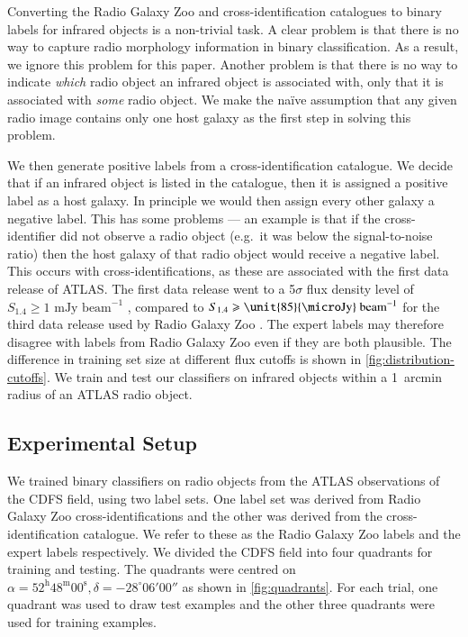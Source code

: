 \documentclass[fleqn,usenatbib,usedcolumn]{mnras}
\newcommand{\jansky}{\text{Jy}}
\begin{document}
    Converting the Radio Galaxy Zoo and \citet{norris06} cross-identification
    catalogues to binary labels for infrared objects is a non-trivial task. A
    clear problem is that there is no way to capture radio morphology
    information in binary classification. As a result, we ignore this problem
    for this paper. Another problem is that there is no way to indicate
    \emph{which} radio object an infrared object is associated with, only that
    it is associated with \emph{some} radio object. We make the na\"ive
    assumption that any given radio image contains only one host galaxy as the
    first step in solving this problem.

    We then generate positive labels from a cross-identification catalogue.
    We decide that if an infrared object is listed in the catalogue, then it
    is assigned a positive label as a host galaxy. In principle we would
    then assign every other galaxy a negative label. This has some problems
    --- an example is that if the cross-identifier did not observe a radio
    object (e.g.~it was below the signal-to-noise ratio) then the host galaxy
    of that radio object would receive a negative label. This occurs with
    \citet{norris06} cross-identifications, as these are associated with the
    first data release of ATLAS. The first data release went to a 5$\sigma$
    flux density level of $S_{1.4} \geq 1 \text{ mJy beam}^{-1}$
    \citep{norris06}, compared to $S_{1.4} \geq \unit{85}{\micro\jansky}\text{
    beam}^{-1}$ for the third data release used by Radio Galaxy Zoo
    \citep{franzen15}. The expert labels may therefore disagree with labels
    from Radio Galaxy Zoo even if they are both plausible. The difference in
    training set size at different flux cutoffs is shown in
    \autoref{fig:distribution-cutoffs}. We train and test our classifiers on
    infrared objects within a 1~arcmin radius of an ATLAS radio object.

  \subsection{Experimental Setup}
  \label{sec:experimental-setup}

    We trained binary classifiers on radio objects from the ATLAS observations
    of the CDFS field, using two label sets. One label set was derived from
    Radio Galaxy Zoo cross-identifications and the other was derived from the
    \citet{norris06} cross-identification catalogue. We refer to these as the
    Radio Galaxy Zoo labels and the expert labels respectively. We divided the
    CDFS field into four quadrants for training and testing. The quadrants
    were centred on $\alpha = 52^\text{h}48^\text{m}00^\text{s},
    \delta = -28^\circ{}06'00''$ as shown in \autoref{fig:quadrants}. For
    each trial, one quadrant was used to draw test examples and the other three
    quadrants were used for training examples.
\end{document}
